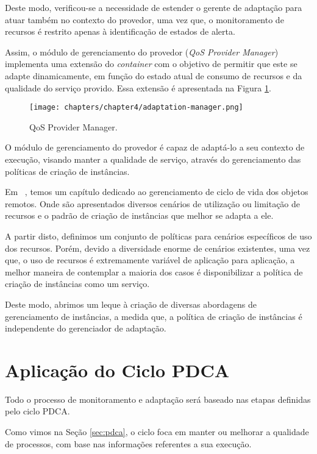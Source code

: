 Deste modo, verificou-se a necessidade de estender o gerente de adaptação para atuar também no contexto do provedor, uma vez que, o monitoramento de recursos é restrito apenas à identificação de estados de alerta.

Assim, o módulo de gerenciamento do provedor (\textit{QoS Provider Manager}) implementa uma extensão do \textit{container} com o  objetivo de permitir que este se adapte dinamicamente, em função do estado atual de consumo de recursos e da qualidade do serviço provido. Essa extensão é apresentada na Figura \ref{fig:adapt_module}.


\begin{figure}[htp]
\centering
\texttt{[image: chapters/chapter4/adaptation-manager.png]}
\caption[QoS Provider Manager]{QoS Provider Manager.}
\label{fig:adapt_module}
\end{figure}

O módulo de gerenciamento do provedor é capaz de adaptá-lo a seu contexto de execução, visando manter a qualidade de serviço, através do gerenciamento das políticas de criação de instâncias.

Em ~\cite{volter2005remoting}, temos um capítulo dedicado ao gerenciamento de ciclo de vida dos objetos remotos. Onde são apresentados diversos cenários de utilização ou limitação de recursos e o padrão de criação de instâncias que melhor se adapta a ele.

A partir disto, definimos um conjunto de políticas para cenários específicos de uso dos recursos. Porém, devido a diversidade enorme de cenários existentes, uma vez que, o uso de recursos é extremamente variável de aplicação para aplicação, a melhor maneira de contemplar a maioria dos casos é disponibilizar a política de criação de instâncias como um serviço. 

Deste modo, abrimos um leque à criação de diversas abordagens de gerenciamento de instâncias, a medida que, a política de criação de instâncias é independente do gerenciador de adaptação.


\section{Aplicação do Ciclo PDCA}
Todo o processo de monitoramento e adaptação será baseado nas etapas definidas pelo ciclo PDCA.

Como vimos na Seção \ref{sec:pdca}, o ciclo foca em manter ou melhorar a qualidade de processos, com base nas informações referentes a sua execução.

